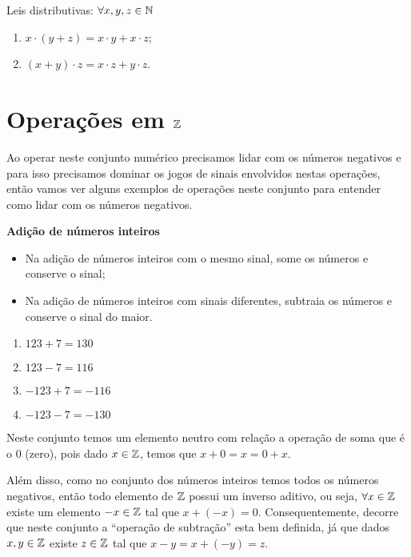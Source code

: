  Leis distributivas: $\forall x, y, z \in \mathbb{N}$
 \begin{enumerate}[1)]
 \item $x \cdot (y + z)= x \cdot y + x \cdot z$;
 \item $(x + y) \cdot z= x \cdot z + y \cdot z$.
 \end{enumerate}

 \section{Operações em \texorpdfstring{$\mathbb{Z}$}{Z}}

 Ao operar neste conjunto numérico precisamos lidar com os números negativos e para isso precisamos dominar os jogos de sinais envolvidos nestas operações, então vamos ver alguns exemplos de operações neste conjunto para entender como lidar com os números negativos.

   \vskip0.3cm

 \textbf{Adição de números inteiros}

 \begin{itemize}
  \item Na adição de números inteiros com o mesmo sinal, some os números e conserve o sinal;
  \item Na adição de números inteiros com sinais diferentes, subtraia os números e conserve o sinal do maior.
 \end{itemize}

  \begin{enumerate}[1)]
   \item $123 + 7= 130$
   \item $123 - 7= 116$
   \item $-123 + 7 = -116$
   \item $-123 - 7 = -130$
 \end{enumerate}

  Neste conjunto temos um elemento neutro com relação a operação de soma que é o $0$ (zero), pois dado $x \in \mathbb{Z}$, temos que $x+0=x=0+x$.

 Além disso, como no conjunto dos números inteiros temos todos os números negativos, então todo elemento de $\mathbb{Z}$ possui um inverso aditivo, ou seja, $\forall x \in \mathbb{Z}$ existe um elemento $-x \in \mathbb{Z}$ tal que $x + (-x)=0$. Consequentemente, decorre que neste conjunto a ``operação de subtração'' esta bem definida, já que dados $x, y \in \mathbb{Z}$ existe $z \in \mathbb{Z}$ tal que $x - y= x+ (-y)= z$.

   \vskip0.3cm

